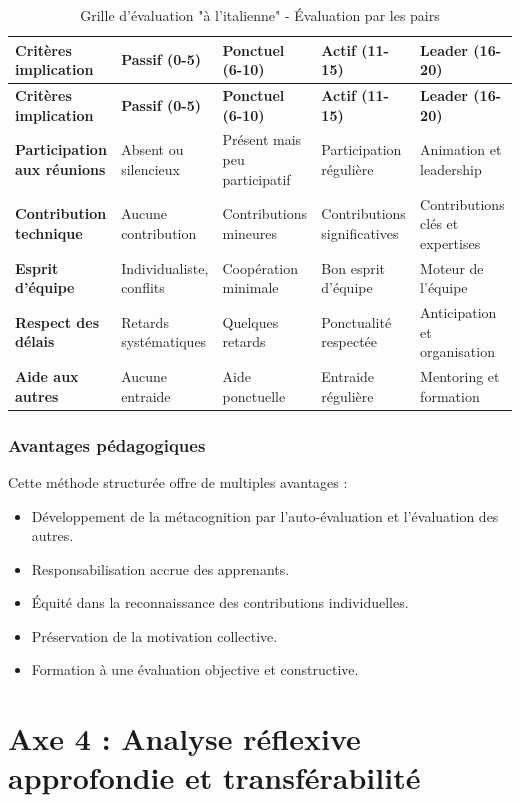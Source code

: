 \begin{longtable}{|p{4cm}|p{3cm}|p{3cm}|p{3cm}|p{3cm}|}
\caption{Grille d'évaluation "à l'italienne" - Évaluation par les pairs} \\
\hline
\textbf{Critères implication} & \textbf{Passif (0-5)} & \textbf{Ponctuel (6-10)} & \textbf{Actif (11-15)} & \textbf{Leader (16-20)} \\
\hline
\endfirsthead
\hline
\textbf{Critères implication} & \textbf{Passif (0-5)} & \textbf{Ponctuel (6-10)} & \textbf{Actif (11-15)} & \textbf{Leader (16-20)} \\
\hline
\endhead
\textbf{Participation aux réunions} &
Absent ou silencieux &
Présent mais peu participatif &
Participation régulière &
Animation et leadership \\
\hline
\textbf{Contribution technique} &
Aucune contribution &
Contributions mineures &
Contributions significatives &
Contributions clés et expertises \\
\hline
\textbf{Esprit d'équipe} &
Individualiste, conflits &
Coopération minimale &
Bon esprit d'équipe &
Moteur de l'équipe \\
\hline
\textbf{Respect des délais} &
Retards systématiques &
Quelques retards &
Ponctualité respectée &
Anticipation et organisation \\
\hline
\textbf{Aide aux autres} &
Aucune entraide &
Aide ponctuelle &
Entraide régulière &
Mentoring et formation \\
\hline
\end{longtable}

\subsubsection{Avantages pédagogiques}
Cette méthode structurée offre de multiples avantages :
\begin{itemize}
    \item Développement de la métacognition par l'auto-évaluation et l'évaluation des autres.
    \item Responsabilisation accrue des apprenants.
    \item Équité dans la reconnaissance des contributions individuelles.
    \item Préservation de la motivation collective.
    \item Formation à une évaluation objective et constructive.
\end{itemize}



\section{Axe 4 : Analyse réflexive approfondie et transférabilité}

